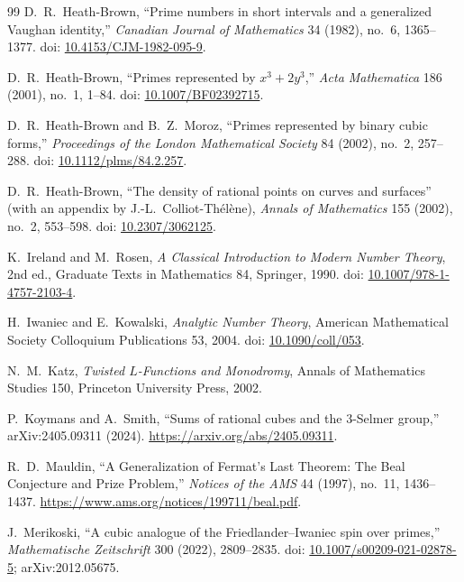 \documentclass[11pt,a4paper]{article}
\begin{document}
\begin{thebibliography}{99}
D.~R.~Heath-Brown, ``Prime numbers in short intervals and a generalized Vaughan identity,''
\emph{Canadian Journal of Mathematics} 34 (1982), no.\ 6, 1365--1377.
doi: \href{https://doi.org/10.4153/CJM-1982-095-9}{10.4153/CJM-1982-095-9}.

D.~R.~Heath-Brown, ``Primes represented by $x^3+2y^3$,''
\emph{Acta Mathematica} 186 (2001), no.\ 1, 1--84. doi:
\href{https://doi.org/10.1007/BF02392715}{10.1007/BF02392715}.

D.~R.~Heath-Brown and B.~Z.~Moroz, ``Primes represented by binary cubic forms,''
\emph{Proceedings of the London Mathematical Society} 84 (2002), no.\ 2, 257--288. doi:
\href{https://doi.org/10.1112/plms/84.2.257}{10.1112/plms/84.2.257}.

D.~R.~Heath-Brown, ``The density of rational points on curves and surfaces'' (with an appendix by J.-L.~Colliot-Thélène),
\emph{Annals of Mathematics} 155 (2002), no.\ 2, 553--598. doi:
\href{https://doi.org/10.2307/3062125}{10.2307/3062125}.

K.~Ireland and M.~Rosen, \emph{A Classical Introduction to Modern Number Theory}, 2nd ed., Graduate Texts in Mathematics 84, Springer, 1990.
doi: \href{https://doi.org/10.1007/978-1-4757-2103-4}{10.1007/978-1-4757-2103-4}.

H.~Iwaniec and E.~Kowalski, \emph{Analytic Number Theory},
American Mathematical Society Colloquium Publications 53, 2004. doi:
\href{https://doi.org/10.1090/coll/053}{10.1090/coll/053}.

N.~M.~Katz, \emph{Twisted $L$-Functions and Monodromy},
Annals of Mathematics Studies 150, Princeton University Press, 2002.

P.~Koymans and A.~Smith, ``Sums of rational cubes and the $3$-Selmer group,'' arXiv:2405.09311 (2024).
\url{https://arxiv.org/abs/2405.09311}.

R.~D.~Mauldin, ``A Generalization of Fermat's Last Theorem: The Beal Conjecture and Prize Problem,''
\emph{Notices of the AMS} 44 (1997), no.\ 11, 1436--1437.
\url{https://www.ams.org/notices/199711/beal.pdf}.

J.~Merikoski, ``A cubic analogue of the Friedlander--Iwaniec spin over primes,''
\emph{Mathematische Zeitschrift} 300 (2022), 2809--2835.
doi: \href{https://doi.org/10.1007/s00209-021-02878-5}{10.1007/s00209-021-02878-5};
arXiv:2012.05675.


\end{thebibliography}
\end{document}
